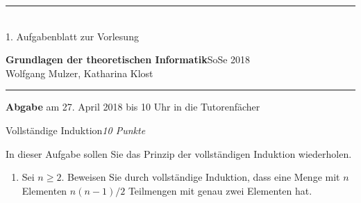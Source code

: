 \documentclass[a4paper,twoside,12pt,fleqn]{article}
\newcommand{\ZETTELNUMMER}{1}
\newcommand{\ABGABEDATUM}{am 27. April 2018 bis 10 Uhr in die
Tutorenf\"acher}
\newcounter{AUFGNR}
\newcommand{\AUFGABE}[2]{\vspace{0.3cm}\item[Aufgabe~\arabic{AUFGNR}]\stepcounter{AUFGNR} #1\hfill\emph{#2}}
\begin{document}
\pagestyle{empty}
\hrule\medskip
\rule{0ex}{0ex}\\[-1ex]
\ZETTELNUMMER. Aufgabenblatt zur Vorlesung

\smallskip
\noindent
\large
\textbf{Grundlagen der theoretischen Informatik}\hfill SoSe 2018 \\[0.5ex]
\normalsize
Wolfgang Mulzer, Katharina Klost

\medskip\hrule

\smallskip
\noindent
\textbf{Abgabe} \ABGABEDATUM

\vskip 0.5cm


\begin{description}
\AUFGABE{Vollst\"andige Induktion}{10 Punkte}

In dieser Aufgabe sollen Sie das Prinzip der vollst\"andigen
Induktion wiederholen.

\begin{enumerate}
  \item Sei $n \geq 2$.
    Beweisen Sie durch vollst\"andige Induktion, dass eine Menge mit $n$
    Elementen $n(n-1)/2$ Teilmengen mit genau zwei Elementen hat.


\end{enumerate}
\end{description}
\end{document}

